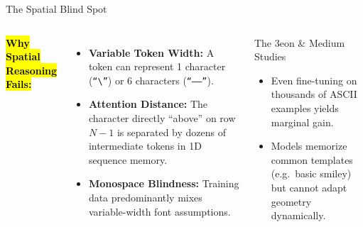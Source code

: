 \documentclass[aspectratio=169,11pt,xcolor={table,dvipsnames}]{beamer}
\begin{document}
\begin{frame}{The Spatial Blind Spot}
  \begin{columns}[T]
      \textbf{\hl{Why Spatial Reasoning Fails:}}
      \begin{itemize}
        \item \textbf{Variable Token Width:} A token can represent 1 character (\texttt{``\textbackslash{}''}) or 6 characters (\texttt{``------''}).
        \item \textbf{Attention Distance:} The character directly ``above'' on row $N-1$ is separated by dozens of intermediate tokens in 1D sequence memory.
        \item \textbf{Monospace Blindness:} Training data predominantly mixes variable-width font assumptions.
      \end{itemize}

      \begin{block}{The 3eon \& Medium Studies}
        \small
        \begin{itemize}
          \item Even fine-tuning on thousands of ASCII examples yields marginal gain.
          \item Models memorize common templates (e.g.\ basic smiley) but cannot adapt geometry dynamically.
        \end{itemize}
      \end{block}
      \vspace{0.25cm}
      \footnotesize{}
  \end{columns}
\end{frame}
\end{document}
